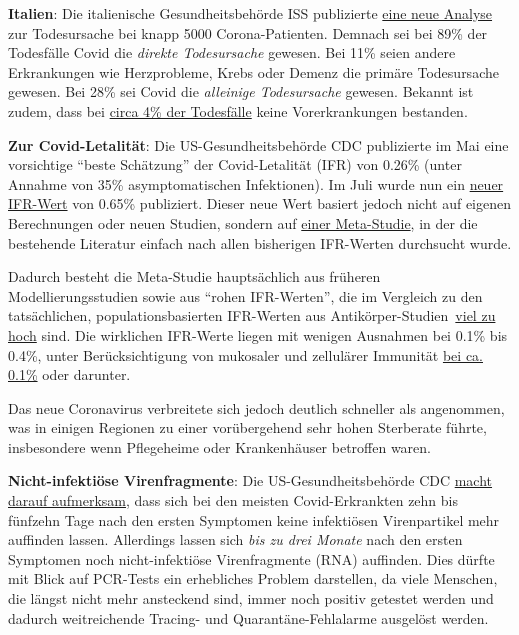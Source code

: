 \textbf{Italien}: Die italienische Gesundheitsbehörde ISS publizierte
\href{https://www.reuters.com/article/us-health-coronavirus-italy-study-idUSKCN24H2VZ}{eine
neue Analyse} zur Todesursache bei knapp 5000 Corona-Patienten. Demnach
sei bei 89\% der Todesfälle Covid die \emph{direkte Todesursache}
gewesen. Bei 11\% seien andere Erkrankungen wie Herzprobleme, Krebs oder
Demenz die primäre Todesursache gewesen. Bei 28\% sei Covid die
\emph{alleinige Todesursache} gewesen. Bekannt ist zudem, dass bei
\href{https://www.bloomberg.com/news/articles/2020-05-26/italy-says-96-of-virus-fatalities-suffered-from-other-illnesses}{circa
4\% der Todesfälle} keine Vorerkrankungen bestanden.

\textbf{Zur Covid-Letalität}: Die US-Gesundheitsbehörde CDC publizierte
im Mai eine vorsichtige ``beste Schätzung'' der Covid-Letalität (IFR)
von 0.26\% (unter Annahme von 35\% asymptomatischen Infektionen). Im
Juli wurde nun ein
\href{https://www.cdc.gov/coronavirus/2019-ncov/hcp/planning-scenarios.html}{neuer
IFR-Wert} von 0.65\% publiziert. Dieser neue Wert basiert jedoch nicht
auf eigenen Berechnungen oder neuen Studien, sondern auf
\href{https://www.medrxiv.org/content/10.1101/2020.05.03.20089854v4}{einer
Meta-Studie}, in der die bestehende Literatur einfach nach allen
bisherigen IFR-Werten durchsucht wurde.

Dadurch besteht die Meta-Studie hauptsächlich aus früheren
Modellierungsstudien sowie aus ``rohen IFR-Werten'', die im Vergleich zu
den tatsächlichen, populationsbasierten IFR-Werten aus
Antikörper-Studien~\href{https://swprs.org/covid-19-letalitat-wie-man-es-nicht-macht/}{viel
zu hoch} sind. Die wirklichen IFR-Werte liegen mit wenigen Ausnahmen bei
0.1\% bis 0.4\%, unter Berücksichtigung von mukosaler und zellulärer
Immunität \href{https://swprs.org/studies-on-covid-19-lethality/}{bei
ca. 0.1\%} oder darunter.

Das neue Coronavirus verbreitete sich jedoch deutlich schneller als
angenommen, was in einigen Regionen zu einer vorübergehend sehr hohen
Sterberate führte, insbesondere wenn Pflegeheime oder Krankenhäuser
betroffen waren.

\textbf{Nicht-infektiöse Virenfragmente}: Die US-Gesundheitsbehörde CDC
\href{https://www.cdc.gov/coronavirus/2019-ncov/hcp/duration-isolation.html}{macht
darauf aufmerksam}, dass sich bei den meisten Covid-Erkrankten zehn bis
fünfzehn Tage nach den ersten Symptomen keine infektiösen Virenpartikel
mehr auffinden lassen. Allerdings lassen sich \emph{bis zu drei Monate}
nach den ersten Symptomen noch nicht-infektiöse Virenfragmente (RNA)
auffinden. Dies dürfte mit Blick auf PCR-Tests ein erhebliches Problem
darstellen, da viele Menschen, die längst nicht mehr ansteckend sind,
immer noch positiv getestet werden und dadurch weitreichende Tracing-
und Quarantäne-Fehlalarme ausgelöst werden.

